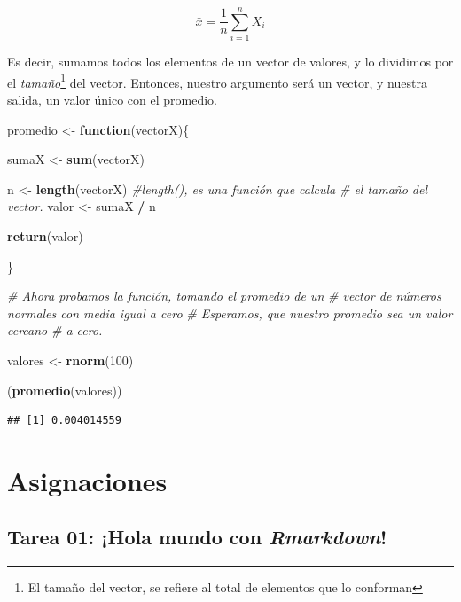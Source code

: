 \documentclass[12pt,letterpaper,]{book}
\newenvironment{Shaded}{\begin{snugshade}}{\end{snugshade}}
\newcommand{\KeywordTok}[1]{\textcolor[rgb]{0.13,0.29,0.53}{\textbf{#1}}}
\newcommand{\DecValTok}[1]{\textcolor[rgb]{0.00,0.00,0.81}{#1}}
\newcommand{\StringTok}[1]{\textcolor[rgb]{0.31,0.60,0.02}{#1}}
\newcommand{\CommentTok}[1]{\textcolor[rgb]{0.56,0.35,0.01}{\textit{#1}}}
\newcommand{\ControlFlowTok}[1]{\textcolor[rgb]{0.13,0.29,0.53}{\textbf{#1}}}
\newcommand{\OperatorTok}[1]{\textcolor[rgb]{0.81,0.36,0.00}{\textbf{#1}}}
\newcommand{\NormalTok}[1]{#1}
\let\rmarkdownfootnote\footnote%
\def\footnote{\protect\rmarkdownfootnote}
\begin{document}
\[
\bar{x}= \frac{1}{n} \sum_{i=1}^{n} X_i
\]

Es decir, sumamos todos los elementos de un vector de valores, y lo
dividimos por el
\emph{tamaño}\footnote{El tamaño del vector, se refiere al total de elementos que lo conforman}
del vector. Entonces, nuestro argumento será un vector, y nuestra
salida, un valor único con el promedio.

\begin{Shaded}
\begin{Highlighting}[]
\NormalTok{promedio <-}\StringTok{ }\ControlFlowTok{function}\NormalTok{(vectorX)\{}
 
\NormalTok{   sumaX <-}\StringTok{ }\KeywordTok{sum}\NormalTok{(vectorX)}
   
\NormalTok{  n <-}\StringTok{ }\KeywordTok{length}\NormalTok{(vectorX) }\CommentTok{#length(), es una función que calcula }
                       \CommentTok{#   el tamaño del vector.}
\NormalTok{  valor <-}\StringTok{ }\NormalTok{sumaX }\OperatorTok{/}\StringTok{ }\NormalTok{n }
  
  \KeywordTok{return}\NormalTok{(valor)}
  
\NormalTok{\}}

\CommentTok{# Ahora probamos la función, tomando el promedio de un }
\CommentTok{#       vector de números normales con media igual a cero}
\CommentTok{#       Esperamos, que nuestro promedio sea un valor cercano}
\CommentTok{#         a cero.}

\NormalTok{valores <-}\StringTok{ }\KeywordTok{rnorm}\NormalTok{(}\DecValTok{100}\NormalTok{)}

\NormalTok{(}\KeywordTok{promedio}\NormalTok{(valores))}
\end{Highlighting}
\end{Shaded}

\begin{verbatim}
## [1] 0.004014559
\end{verbatim}

\chapter{Asignaciones}\label{asignaciones}

\section{\texorpdfstring{Tarea 01: ¡Hola mundo con
\emph{Rmarkdown}!}{Tarea 01: ¡Hola mundo con Rmarkdown!}}\label{tarea-01-hola-mundo-con-rmarkdown}
\end{document}

